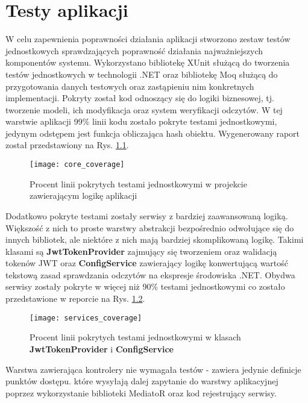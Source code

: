 \chapter{Testy aplikacji}
W celu zapewnienia poprawności działania aplikacji stworzono zestaw testów jednostkowych
sprawdzających poprawność działania najważniejszych komponentów systemu. 
Wykorzystano bibliotekę XUnit służącą do tworzenia testów jednostkowych w technologii .NET
oraz bibliotekę Moq służącą do przygotowania danych testowych oraz zastąpieniu nim konkretnych implementacji.
Pokryty został kod odnoszący się do logiki biznesowej, tj. tworzenie modeli, ich modyfikacja
oraz system weryfikacji odczytów. W tej warstwie aplikacji 99\% linii kodu zostało pokryte
testami jednostkowymi, jedynym odstępem jest funkcja obliczająca hash obiektu.
Wygenerowany raport został przedstawiony na Rys. \ref{core:coverage}.
\begin{figure}[h!]
  \centering
  \texttt{[image: core\_coverage]}
  \caption{Procent linii pokrytych testami jednostkowymi w projekcie zawierającym logikę aplikacji}
  \label{core:coverage}
\end{figure}
Dodatkowo pokryte testami zostały serwisy z bardziej zaawansowaną logiką. Większość z nich to proste
warstwy abstrakcji bezpośrednio odwołujące się do innych bibliotek, ale niektóre z nich mają bardziej
skomplikowaną logikę. Takimi klasami są \textbf{JwtTokenProvider} zajmujący się tworzeniem oraz walidacją
tokenów JWT oraz \textbf{ConfigService} zawierający logikę konwertującą wartość tekstową zasad sprawdzania
odczytów na ekspresje środowiska .NET. Obydwa serwisy zostały pokryte w więcej niż 90\% testami jednostkowymi
co zostało przedstawione w reporcie na Rys. \ref{services:coverage}.
\begin{figure}[h!]
  \centering
  \texttt{[image: services\_coverage]}
  \caption{Procent linii pokrytych testami jednostkowymi w klasach \textbf{JwtTokenProvider} i \textbf{ConfigService}}
  \label{services:coverage}
\end{figure}
Warstwa zawierająca kontrolery nie wymagała testów - zawiera jedynie definicje punktów dostępu.
które wysyłają dalej zapytanie do warstwy aplikacyjnej poprzez wykorzystanie biblioteki MediatoR
oraz kod rejestrujący serwisy.
